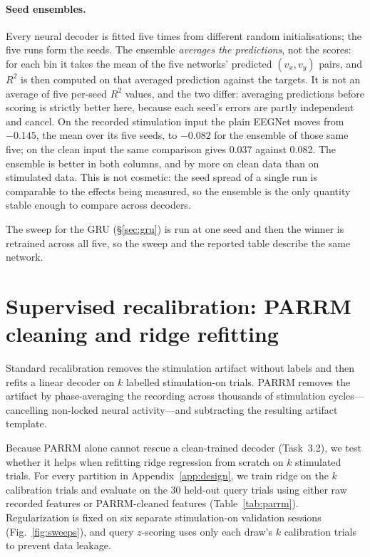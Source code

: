 \documentclass[11pt]{article}
\newcommand{\Rtwo}{R^{2}}
\begin{document}
\paragraph{Seed ensembles.} Every neural decoder is fitted five times from different random
initialisations; the five runs form the seeds. The ensemble \emph{averages the predictions},
not the scores: for each bin it takes the mean of the five networks' predicted $(v_x,v_y)$
pairs, and $\Rtwo$ is then computed on that averaged prediction against the targets. It is
not an average of five per-seed $\Rtwo$ values, and the two differ: averaging predictions
before scoring is strictly better here, because each seed's errors are partly independent and
cancel. On the recorded stimulation input the plain EEGNet moves from $-0.145$, the mean over
its five seeds, to $-0.082$ for the ensemble of those same five; on the clean input the same
comparison gives 0.037 against 0.082. The ensemble is better in both columns, and by more on
clean data than on stimulated data. This is not cosmetic: the seed spread of a single run is
comparable to the effects being measured, so the ensemble is the only quantity stable enough
to compare across decoders.

The sweep for the GRU (\S\ref{sec:gru}) is run at one seed and then the winner is
retrained across all five, so the sweep and the reported table describe the same network.

\section{Supervised recalibration: PARRM cleaning and ridge refitting}\label{app:parrm}\label{sec:parrm}
Standard recalibration removes the stimulation artifact without labels and then refits a linear decoder on $k$ labelled stimulation-on trials. PARRM removes the artifact by phase-averaging the recording across thousands of stimulation cycles—cancelling non-locked neural activity—and subtracting the resulting artifact template.

Because PARRM alone cannot rescue a clean-trained decoder (Task~3.2), we test whether it helps when refitting ridge regression from scratch on $k$ stimulated trials. For every partition in Appendix~\ref{app:design}, we train ridge on the $k$ calibration trials and evaluate on the 30 held-out query trials using either raw recorded features or PARRM-cleaned features (Table~\ref{tab:parrm}). Regularization is fixed on six separate stimulation-on validation sessions (Fig.~\ref{fig:sweeps}), and query $z$-scoring uses only each draw's $k$ calibration trials to prevent data leakage.
\end{document}
